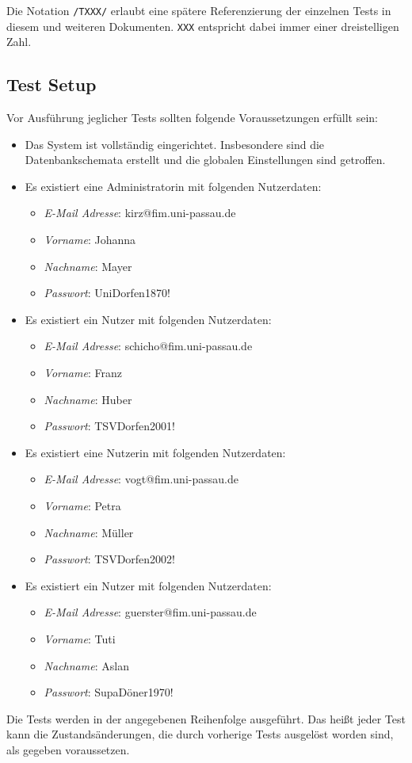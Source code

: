 Die Notation \texttt{/TXXX/} erlaubt eine spätere Referenzierung der einzelnen Tests in diesem und weiteren
Dokumenten. \texttt{XXX} entspricht dabei immer einer dreistelligen Zahl.
\subsection{Test Setup}\label{setup}
Vor Ausführung jeglicher Tests sollten folgende Voraussetzungen erfüllt sein:
\begin{itemize}
	\item Das System ist vollständig eingerichtet.
	Insbesondere sind die Datenbankschemata erstellt und die globalen Einstellungen sind getroffen.
	\item Es existiert eine Administratorin mit folgenden Nutzerdaten:
	\begin{itemize}
		\item \emph{E-Mail Adresse}: kirz@fim.uni-passau.de
		\item \emph{Vorname}: Johanna
		\item \emph{Nachname}: Mayer
		\item \emph{Passwort}: UniDorfen1870!
	\end{itemize}
	\item Es existiert ein Nutzer mit folgenden Nutzerdaten:
	\begin{itemize}
		\item \emph{E-Mail Adresse}: schicho@fim.uni-passau.de
		\item \emph{Vorname}: Franz
		\item \emph{Nachname}: Huber
		\item \emph{Passwort}: TSVDorfen2001!
	\end{itemize}
	\item Es existiert eine Nutzerin mit folgenden Nutzerdaten:
	\begin{itemize}
		\item \emph{E-Mail Adresse}: vogt@fim.uni-passau.de
		\item \emph{Vorname}: Petra
		\item \emph{Nachname}: Müller
		\item \emph{Passwort}: TSVDorfen2002!
	\end{itemize}
	\item Es existiert ein Nutzer mit folgenden Nutzerdaten:
	\begin{itemize}
		\item \emph{E-Mail Adresse}: guerster@fim.uni-passau.de
		\item \emph{Vorname}: Tuti
		\item \emph{Nachname}: Aslan
		\item \emph{Passwort}: SupaDöner1970!
	\end{itemize}
\end{itemize}
Die Tests werden in der angegebenen Reihenfolge ausgeführt.
Das heißt jeder Test kann die Zustandsänderungen, die durch vorherige Tests ausgelöst worden sind, als gegeben voraussetzen.
